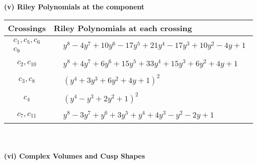 \documentclass[1p]{elsarticle_modified}
\theoremstyle{definition}
\begin{document}
\newpage\renewcommand{\arraystretch}{1}
\flushleft \textbf{(v) Riley Polynomials at the component}\newline \\
\begin{tabular}{m{50pt}|m{274pt}}
Crossings & \hspace{64pt}Riley Polynomials at each crossing \\
\hline $$\begin{aligned}c_{1},c_{5},c_{6}\\c_{9}\end{aligned}$$&$\begin{aligned}
&y^8-4 y^7+10 y^6-17 y^5+21 y^4-17 y^3+10 y^2-4 y+1
\end{aligned}$\\
\hline $$\begin{aligned}c_{2},c_{10}\end{aligned}$$&$\begin{aligned}
&y^8+4 y^7+6 y^6+15 y^5+33 y^4+15 y^3+6 y^2+4 y+1
\end{aligned}$\\
\hline $$\begin{aligned}c_{3},c_{8}\end{aligned}$$&$\begin{aligned}
&(y^4+3 y^3+6 y^2+4 y+1)^2
\end{aligned}$\\
\hline $$\begin{aligned}c_{4}\end{aligned}$$&$\begin{aligned}
&(y^4- y^3+2 y^2+1)^2
\end{aligned}$\\
\hline $$\begin{aligned}c_{7},c_{11}\end{aligned}$$&$\begin{aligned}
&y^8-3 y^7+y^6+3 y^5+y^4+4 y^3- y^2-2 y+1
\end{aligned}$\\
\hline
\end{tabular}\\~\\
\newpage\flushleft \textbf{(vi) Complex Volumes and Cusp Shapes}
\end{document}

